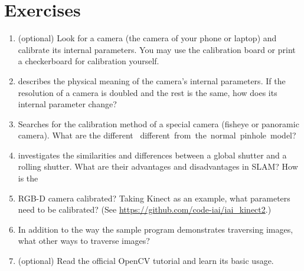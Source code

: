 \section*{ Exercises}

\begin{enumerate}
	\item (optional) Look for a camera (the camera of your phone or laptop) and calibrate its internal parameters. You may use the calibration board or print a checkerboard for calibration yourself.
	\item describes the physical meaning of the camera's internal parameters. If the resolution of a camera is doubled and the rest is the same, how does its internal parameter change?
	\item Searches for the calibration method of a special camera (fisheye or panoramic camera). What are the different \mbox{ different from the normal pinhole model? }
	\item investigates the similarities and differences between a global shutter and a rolling shutter. What are their advantages and disadvantages in SLAM?
	How is the \item RGB-D camera calibrated? Taking Kinect as an example, what parameters need to be calibrated? (See \url{https://github.com/code-iai/iai_kinect2}.)
	\item In addition to the way the sample program demonstrates traversing images, what other ways to traverse images?
	\item (optional) Read the official OpenCV tutorial and learn its basic usage.
\end{enumerate}